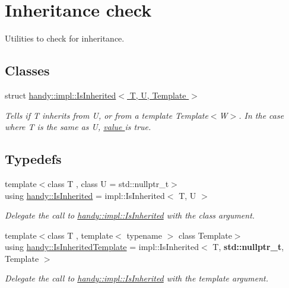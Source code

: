 \hypertarget{group__InheritanceGroup}{}\section{Inheritance check}
\label{group__InheritanceGroup}


Utilities to check for inheritance.  


\subsection*{Classes}
\begin{DoxyCompactItemize}
\item 
struct \hyperlink{structhandy_1_1impl_1_1IsInherited}{handy\+::impl\+::\+Is\+Inherited$<$ T, U, Template $>$}
\begin{DoxyCompactList}\small\item\em Tells if {\ttfamily T} inherits from {\ttfamily U}, or from a template {\ttfamily Template$<$\+W$>$}. In the case where {\ttfamily T} is the same as {\ttfamily U}, \hyperlink{structhandy_1_1impl_1_1IsInherited_ade331c690ccfcc4c9fbe160b83f9491ba3347f5ab27dd0282a949005f868dcde7}{value } is {\ttfamily true}. \end{DoxyCompactList}\end{DoxyCompactItemize}
\subsection*{Typedefs}
\begin{DoxyCompactItemize}
\item 
{\footnotesize template$<$class T , class U  = std\+::nullptr\+\_\+t$>$ }\\using \hyperlink{group__InheritanceGroup_ga534fbf017347da385a1fea5a1a9d6714}{handy\+::\+Is\+Inherited} = impl\+::\+Is\+Inherited$<$ T, U $>$
\begin{DoxyCompactList}\small\item\em Delegate the call to \hyperlink{structhandy_1_1impl_1_1IsInherited}{handy\+::impl\+::\+Is\+Inherited} with the class argument. \end{DoxyCompactList}\item 
{\footnotesize template$<$class T , template$<$ typename $>$ class Template$>$ }\\using \hyperlink{group__InheritanceGroup_gaea8281081535355f96f3b6ae97f79691}{handy\+::\+Is\+Inherited\+Template} = impl\+::\+Is\+Inherited$<$ T, {\bf std\+::nullptr\+\_\+t}, Template $>$
\begin{DoxyCompactList}\small\item\em Delegate the call to \hyperlink{structhandy_1_1impl_1_1IsInherited}{handy\+::impl\+::\+Is\+Inherited} with the template argument. \end{DoxyCompactList}\end{DoxyCompactItemize}


